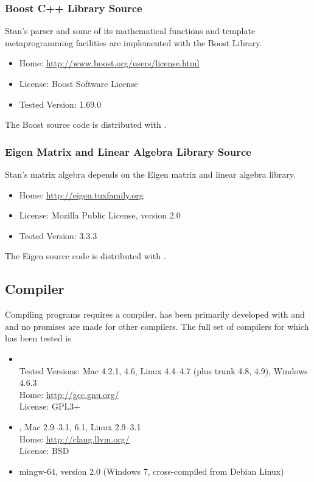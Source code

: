 \subsubsection{Boost C++ Library Source}

Stan's parser and some of its mathematical functions and template
metaprogramming facilities are implemented with the Boost \Cpp
Library.
%
\begin{itemize}
\item Home: \url{http://www.boost.org/users/license.html}
\item License: Boost Software License
\item Tested Version: 1.69.0
\end{itemize}
%
The Boost source code is distributed with \CmdStan.


\subsubsection{Eigen Matrix and Linear Algebra Library Source}

Stan's matrix algebra depends on the Eigen \Cpp matrix and linear
algebra library.
%
\begin{itemize}
\item Home: \url{http://eigen.tuxfamily.org}
\item License: Mozilla Public License, version 2.0
\item Tested Version: 3.3.3
\end{itemize}
%
The Eigen source code is distributed with \CmdStan.


\subsection{\Cpp Compiler}

Compiling \CmdStan programs requires a \Cpp compiler.  \CmdStan has been
primarily developed with \clang and \gpp and no promises are made for
other compilers.  The full set of compilers for which \CmdStan has been
tested is
%
\begin{itemize}
%
\item \gpp
\\
Tested Versions: Mac 4.2.1, 4.6, Linux 4.4--4.7 (plus trunk 4.8, 4.9), Windows 4.6.3
\\
Home: \url{http://gcc.gnu.org/}
\\
License: GPL3+
%
\item \clang, Mac 2.9--3.1, 6.1, Linux 2.9--3.1
\\
Home: \url{http://clang.llvm.org/}
\\
License: BSD
%
\item mingw-64, version 2.0 (Windows 7, cross-compiled from Debian Linux)
%
\end{itemize}
%


